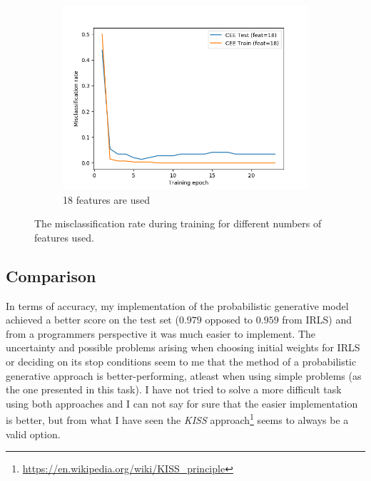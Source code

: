 \documentclass[a4paper,11pt]{article}
\begin{document}
\begin{figure}
\begin{subfigure}[b]{0.49\textwidth}
		\includegraphics[width=\textwidth]{images/irls_mcr-18.png}
		\caption{18 features are used}
		\label{irls:mcr_18}
	\end{subfigure}
	\caption{The misclassification rate during training for different numbers of features used.}
	\label{irls:mcr}
\end{figure} 

\subsection{Comparison}

In terms of accuracy, my implementation of the probabilistic generative model achieved a better score on the test set ($0.979$ opposed to $0.959$ from IRLS) and from a programmers perspective it was much easier to implement. The uncertainty and possible problems arising when choosing initial weights for IRLS or deciding on its stop conditions seem to me that the method of a probabilistic generative approach is better-performing, atleast when using simple problems (as the one presented in this task). I have not tried to solve a more difficult task using both approaches and I can not say for sure that the easier implementation is better, but from what I have seen the \textit{KISS} approach\footnote{\url{https://en.wikipedia.org/wiki/KISS_principle}} seems to always be a valid option.
\end{document}
